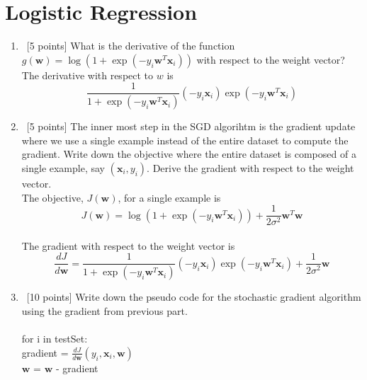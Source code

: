 \section{Logistic Regression}\label{sec:q1}

\begin{enumerate}
\item~[5 points] What is the derivative of the function
  $g(\mathbf{w})=\log(1+\exp(-y_i \mathbf{w}^T\mathbf{x}_i))$ with
  respect to the weight vector?\\
  The derivative with respect to $w$ is
\begin{equation*}
  \frac{1}{1+\exp(-y_i \mathbf{w}^T\mathbf{x}_i)}(-y_i \mathbf{x}_i) \exp(-y_i \mathbf{w}^T\mathbf{x}_i)
\end{equation*}

\item~[5 points] The inner most step in the SGD algorihtm is the
  gradient update where we use a single example instead of the entire
  dataset to compute the gradient.  Write down the objective where the
  entire dataset is composed of a single example, say
  $(\mathbf{x}_i, y_i)$.  Derive the gradient with respect to the
  weight vector.\\
  The objective, $J(\mathbf{w})$, for a single example is 
\begin{equation*}
    J(\mathbf{w})=\log(1+\exp(-y_i \mathbf{w}^{T}\mathbf{x}_i))+\frac{1}{2\sigma^2}\mathbf{w}^T \mathbf{w}
\end{equation*} \\
The gradient with respect to the weight vector is 
\begin{equation*}
  \frac{dJ}{d\mathbf{w}} = \frac{1}{1+\exp(-y_i \mathbf{w}^T\mathbf{x}_i)}(-y_i \mathbf{x}_i) \exp(-y_i \mathbf{w}^T\mathbf{x}_i) + \frac{1}{2\sigma^2}\mathbf{w}
\end{equation*}

\item~[10 points] Write down the pseudo code for the stochastic
  gradient algorithm using the gradient from previous part.\\
  \\
  for i in testSet:\\
  gradient = $\frac{dJ}{d\mathbf{w}}(y_i, \mathbf{x}_i, \mathbf{w})$\\
  $\mathbf{w}$ = $\mathbf{w}$ - gradient


\end{enumerate}

